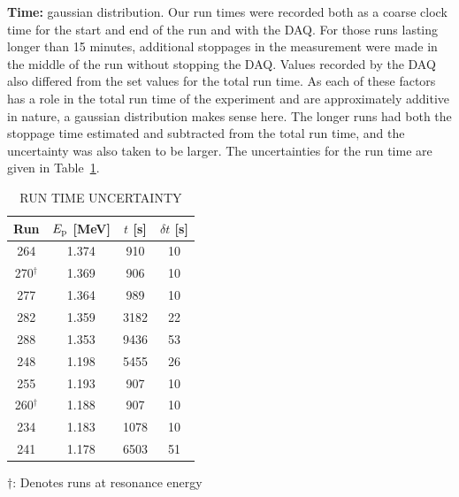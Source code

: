 \textbf{Time:} gaussian distribution. Our run times were recorded both
as a coarse clock time for the start and end of the run and with the
DAQ. For those runs lasting longer than 15 minutes, additional stoppages
in the measurement were made in the middle of the run without stopping
the DAQ. Values recorded by the DAQ also differed from the set values
for the total run time. As each of these factors has a role in the total
run time of the experiment and are approximately additive in nature, a
gaussian distribution makes sense here. The longer runs had both the
stoppage time estimated and subtracted from the total run time, and the
uncertainty was also taken to be larger. The uncertainties for the run
time are given in Table~\ref{tab:run-time-uncertainty}.

\begin{table}
    \begin{center}
        \caption{RUN TIME UNCERTAINTY}
        \label{tab:run-time-uncertainty}
        \begin{tabular}{cccc}
            \toprule
            \midrule
            \textbf{Run} & \textbf{$E_{\rm p}$ [MeV]} & \textbf{$t$ [s]}
                & \textbf{$\delta t$ [s]} \\
            \midrule
                264           & 1.374 &  910 & 10 \\
                270$^\dagger$ & 1.369 &  906 & 10 \\
                277           & 1.364 &  989 & 10 \\
                282           & 1.359 & 3182 & 22 \\
                288           & 1.353 & 9436 & 53 \\
                248           & 1.198 & 5455 & 26 \\
                255           & 1.193 &  907 & 10 \\
                260$^\dagger$ & 1.188 &  907 & 10 \\
                234           & 1.183 & 1078 & 10 \\
                241           & 1.178 & 6503 & 51 \\
            \bottomrule
        \end{tabular}

        \vspace{0.5em}
        $\dagger$: Denotes runs at resonance energy
    \end{center}
\end{table}

